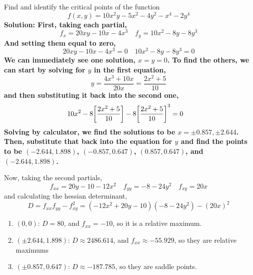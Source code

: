 \begin{example}
    Find and identify the critical points of the function
    \[ f(x, y) = 10x^2y-5x^2-4y^2-x^4-2y^4 \]\bf{Solution: }First, taking each partial,
    \[ f_x = 20xy - 10x - 4x^3\quad f_y = 10x^2-8y-8y^3\]
    And setting them equal to zero,
    \[ 20xy - 10x -4x^3 = 0\quad 10x^2-8y-8y^3 = 0\]
    We can immediately see one solution, \(x=y=0\). To find the others, we can start by solving for \(y\) in the first equation,
    \[ y = \frac{4x^3+10x}{20x} = \frac{2x^2+5}{10}\]
    and then substituting it back into the second one,
    \begin{align*}
        10x^2-8\bqty{\frac{2x^2+5}{10}}-8\bqty{\frac{2x^2+5}{10}}^3 &= 0
    \end{align*}
    Solving by calculator, we find the solutions to be \(x = \pm 0.857, \pm 2.644\). Then, substitute that back into the equation for \(y\) and find the points to be \((-2.644, 1.898)\), \((-0.857, 0.647)\), \((0.857, 0.647)\), and \((-2.644, 1.898)\).\par Now, taking the second partials,
    \[ f_{xx} = 20y-10 - 12x^2\quad f_{yy} = -8-24y^2\quad f_{xy} = 20x \]
    and calculating the hessian determinant,
    \[ D = f_{xx}f_{yy}-f_{xy}^2 = (-12x^2+20y-10)(-8-24y^2) - (20x)^2\]
    \begin{enumerate}
        \item \((0,0)\): \(D=80\), and \(f_{xx} = -10\), so it is a relative maximum. 
        \item \((\pm2.644, 1.898)\):  \(D\approx 2486.614\), and \(f_{xx}\approx -55.929\), so they are relative maximums
        \item \((\pm0.857, 0.647)\): \(D\approx -187.785\), so they are saddle points.
    \end{enumerate}
\end{example}
